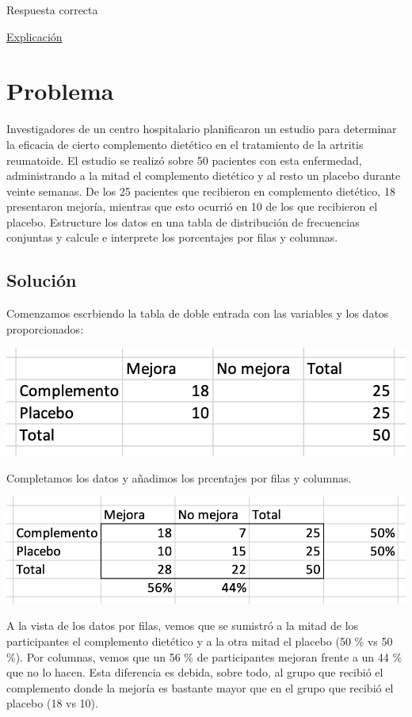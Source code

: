 \documentclass[
]{book}
\begin{document}
Respuesta correcta

\href{https://1fjmanzano.github.io/bioestadistica/otros-gra\%CC\%81ficos.html}{Explicación}

\hypertarget{problema-7}{%
\section{Problema}\label{problema-7}}

Investigadores de un centro hospitalario planificaron un estudio para determinar la eficacia de cierto complemento dietético en el tratamiento de la artritis reumatoide. El estudio se realizó sobre 50 pacientes con esta enfermedad, administrando a la mitad el complemento dietético y al resto un placebo durante veinte semanas. De los 25 pacientes que recibieron en complemento dietético, 18 presentaron mejoría, mientras que esto ocurrió en 10 de los que recibieron el placebo. Estructure los datos en una tabla de distribución de frecuencias conjuntas y calcule e interprete los porcentajes por filas y columnas.

\hypertarget{soluciuxf3n-6}{%
\subsection{Solución}\label{soluciuxf3n-6}}

Comenzamos escrbiendo la tabla de doble entrada con las variables y los datos proporcionados:

\includegraphics[width=11.03in]{img/2_4}

Completamos los datos y añadimos los prcentajes por filas y columnas.

\includegraphics[width=13.44in]{img/2_5}

A la vista de los datos por filas, vemos que se sumistró a la mitad de los participantes el complemento dietético y a la otra mitad el placebo (50 \% vs 50 \%). Por columnas, vemos que un 56 \% de participantes mejoran frente a un 44 \% que no lo hacen. Esta diferencia es debida, sobre todo, al grupo que recibió el complemento donde la mejoría es bastante mayor que en el grupo que recibió el placebo (18 vs 10).
\end{document}

